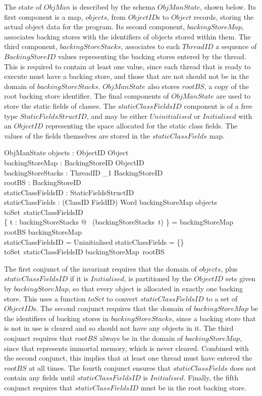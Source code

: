 The state of $ObjMan$ is described by the schema $ObjManState$, shown
below.
Its first component is a map, $objects$, from $ObjectID$s to $Object$
records, storing the actual object data for the program.
Its second component, $backingStoreMap$, associates backing stores
with the identifiers of objects stored within them.
The third component, $backingStoreStacks$, associates to each
$ThreadID$ a sequence of $BackingStoreID$ values representing the
backing stores entered by the thread.
This is required to contain at least one value, since each thread that
is ready to execute must have a backing store, and those that are not
should not be in the domain of $backingStoreStacks$.
$ObjManState$ also stores $rootBS$, a copy of the root backing store
identifier.
The final components of $ObjManState$ are used to store the static
fields of classes.
The $staticClassFieldsID$ component is of a free type
$StaticFieldsStructID$, and may be either $Uninitialised$ or
$Initialised$ with an $ObjectID$ representing the space allocated for
the static class fields.
The values of the fields themselves are stored in the
$staticClassFields$ map.
\begin{schema}{ObjManState}
  objects : ObjectID \pfun Object \\
  backingStoreMap : BackingStoreID \pfun \finset ObjectID \\
  backingStoreStacks : ThreadID \pfun \seq_1 BackingStoreID \\
  rootBS : BackingStoreID \\
  staticClassFieldsID : StaticFieldsStructID \\
  staticClassFields : (ClassID \cross FieldID) \pfun Word
\where
  backingStoreMap \partition \dom objects \cup toSet~staticClassFieldsID \\
  \bigcup \{ t : \dom backingStoreStacks @ \ran~(backingStoreStacks~t) \} = \dom backingStoreMap \\
  rootBS \in \dom backingStoreMap \\
  staticClassFieldsID = Uninitialised \implies staticClassFields = \{\} \\
  toSet~staticClassFieldsID \subseteq backingStoreMap~rootBS
\end{schema}
The first conjunct of the invariant requires that the domain of
$objects$, plus $staticClassFieldsID$ if it is $Initialised$, is
partitioned by the $ObjectID$ sets given by $backingStoreMap$, so that
every object is allocated in exactly one backing store.
This uses a function $toSet$ to convert $staticClassFieldsID$ to a set
of $ObjectID$s.
The second conjunct requires that the domain of $backingStoreMap$ be
the identifiers of backing stores in $backingStoreStacks$, since a
backing store that is not in use is cleared and so should not have any
objects in it.
The third conjunct requires that $rootBS$ always be in the domain of
$backingStoreMap$, since that represents immortal memory, which is
never cleared.
Combined with the second conjunct, this implies that at least one
thread must have entered the $rootBS$ at all times.
The fourth conjunct ensures that $staticClassFields$ does not contain
any fields until $staticClassFieldsID$ is $Initialised$.
Finally, the fifth conjunct requires that $staticClassFieldsID$ must
be in the root backing store.

